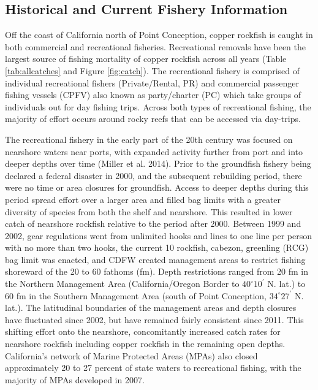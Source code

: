 \documentclass[11pt,
  english,
  letterpaper,
]{article}
\begin{document}
\hypertarget{historical-and-current-fishery-information}{%
\subsection{Historical and Current Fishery Information}\label{historical-and-current-fishery-information}}

Off the coast of California north of Point Conception, copper rockfish is caught in both commercial and recreational fisheries. Recreational removals have been the largest source of fishing mortality of copper rockfish across all years (Table \ref{tab:allcatches} and Figure \ref{fig:catch}). The recreational fishery is comprised of individual recreational fishers (Private/Rental, PR) and commercial passenger fishing vessels (CPFV) also known as party/charter (PC) which take groups of individuals out for day fishing trips. Across both types of recreational fishing, the majority of effort occurs around rocky reefs that can be accessed via day-trips.

The recreational fishery in the early part of the 20th century was focused on nearshore waters near ports, with expanded activity further from port and into deeper depths over time (Miller et al. 2014). Prior to the groundfish fishery being declared a federal disaster in 2000, and the subsequent rebuilding period, there were no time or area closures for groundfish. Access to deeper depths during this period spread effort over a larger area and filled bag limits with a greater diversity of species from both the shelf and nearshore. This resulted in lower catch of nearshore rockfish relative to the period after 2000. Between 1999 and 2002, gear regulations went from unlimited hooks and lines to one line per person with no more than two hooks, the current 10 rockfish, cabezon, greenling (RCG) bag limit was enacted, and CDFW created management areas to restrict fishing shoreward of the 20 to 60 fathoms (fm). Depth restrictions ranged from 20 fm in the Northern Management Area (California/Oregon Border to $40^\circ 10^\prime$ N. lat.) to 60 fm in the Southern Management Area (south of Point Conception, $34^\circ 27^\prime$ N. lat.). The latitudinal boundaries of the management areas and depth closures have fluctuated since 2002, but have remained fairly consistent since 2011. This shifting effort onto the nearshore, concomitantly increased catch rates for nearshore rockfish including copper rockfish in the remaining open depths. California's network of Marine Protected Areas (MPAs) also closed approximately 20 to 27 percent of state waters to recreational fishing, with the majority of MPAs developed in 2007.
\end{document}
